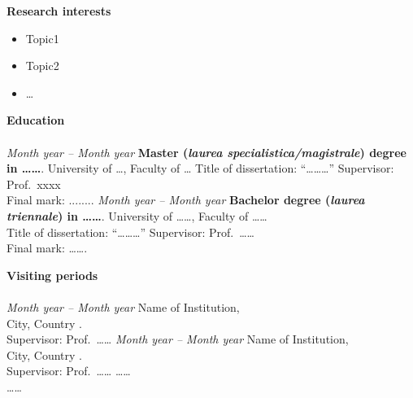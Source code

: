 \documentclass[10pt]{amsart}
\begin{document}
	{\large {\bf Research interests}} \\[-.08cm] 
	\underline{\hspace{6in}} 
	\begin{itemize}
		\item 	Topic1 
		\item 	Topic2
		\item	\ldots
	\end{itemize}
	\vspace{2ex}
	{\large {\bf Education}} \\[-.08cm] 
	\underline{\hspace{6in}} \\[.2cm] 
	{\it Month year -- Month year } \newline
	{\bf Master ({\it laurea specialistica/magistrale}) degree in \ldots \ldots  }.\newline
	University of \ldots, Faculty of \ldots\newline
	Title of dissertation: ``\ldots \ldots \ldots  '' \newline
	Supervisor: Prof.\ xxxx\\
	Final mark: ........ 
	\newline\newline
	{\it Month year -- Month year} \newline
	{\bf Bachelor degree ({\it laurea triennale}) in \ldots \ldots}. \newline
	University of  \ldots \ldots, Faculty of  \ldots \ldots\\
	Title of dissertation: ``\ldots \ldots \ldots  '' \newline
	Supervisor: Prof.\  \ldots \ldots\\
	Final mark:  \ldots \ldots.
	\newline\newline
	
	{\large {\bf Visiting periods}} \\[-.08cm] 
	\underline{\hspace{6in}}\\[.2cm] 
	{\it Month year -- Month year }\newline
	Name of Institution,\\ City, Country .\\
	Supervisor: Prof.\ \ldots \ldots \newline
	\newline
	{\it Month year -- Month year }\newline
	Name of Institution,\\ City, Country .\\
	Supervisor: Prof.\ \ldots \ldots \newline
	\newline
	\ldots \ldots\\
	\ldots\ldots  \\
	
\end{document}
